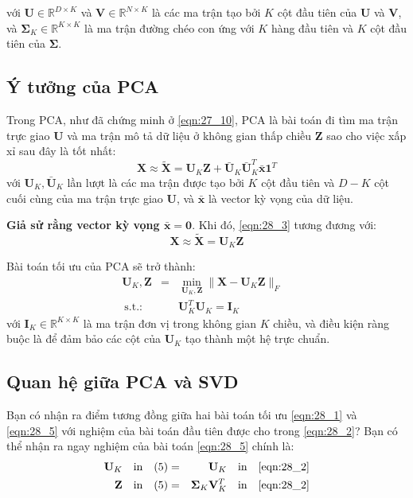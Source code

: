 với $\mathbf{U} \in \mathbb{R}^{D \times K}$ và $\mathbf{V}\in \mathbb{R}^{N\times K}$ là các ma trận tạo bởi $K$ cột đầu tiên của $\mathbf{U}$ và $\mathbf{V}$, và $\mathbf{\Sigma}_K \in \mathbb{R}^{K \times K}$ là ma trận đường chéo con ứng với $K$ hàng đầu tiên và $K$ cột đầu tiên của $\mathbf{\Sigma}$. 
 
 
\subsection{Ý tưởng của PCA}
Trong PCA, như đã chứng minh ở \eqref{eqn:27_10}, PCA là bài toán đi tìm ma trận trực giao $\mathbf{U}$ và ma trận mô tả dữ liệu ở không gian thấp chiều $\mathbf{Z}$ sao cho việc xấp xỉ sau đây là tốt nhất: 
\begin{equation} 
\label{eqn:28_3}
\mathbf{X} \approx \tilde{\mathbf{X}} = \mathbf{U}_K \mathbf{Z} + \bar{\mathbf{U}}_K \bar{\mathbf{U}}_K^T\bar{\mathbf{x}}\mathbf{1}^T 
\end{equation} 
với $\mathbf{U}_K, \bar{\mathbf{U}}_K$ lần lượt là các ma trận được tạo bởi $K$ cột đầu tiên và $D-K$ cột cuối cùng của ma trận trực giao $\mathbf{U}$, và $\bar{\mathbf{x}}$ là vector kỳ vọng của dữ liệu. 
 
\textbf{Giả sử rằng vector kỳ vọng $\bar{\mathbf{x}} = \mathbf{0}$}. Khi đó, \eqref{eqn:28_3} tương đương với: 
\begin{equation} 
\label{eqn:28_4}
\mathbf{X} \approx \tilde{\mathbf{X}} = \mathbf{U}_K \mathbf{Z}
\end{equation} 
 
Bài toán tối ưu của PCA sẽ trở thành: 
\begin{equation} 
\label{eqn:28_5}
\begin{aligned} 
  \mathbf{U}_K, \mathbf{Z} &=& \min_{\mathbf{U}_K, \mathbf{Z} } \|\mathbf{X} - \mathbf{U}_K \mathbf{Z}\|_F\\\ 
  \text{s.t.:}&& \mathbf{U}_K^T \mathbf{U}_K = \mathbf{I}_K & 
\end{aligned} 
\end{equation} 
với $\mathbf{I}_K \in \mathbb{R}^{K\times K}$ là ma trận đơn vị trong không gian $K$ chiều, và điều kiện ràng buộc là để đảm bảo các cột của $\mathbf{U}_K$ tạo thành một hệ trực chuẩn. 
 
 
\subsection{Quan hệ giữa PCA và SVD}
Bạn có nhận ra điểm tương đồng giữa hai bài toán tối ưu \eqref{eqn:28_1} và \eqref{eqn:28_5} với nghiệm của bài toán đầu tiên được cho trong \eqref{eqn:28_2}? Bạn có thể nhận ra ngay nghiệm của bài toán \eqref{eqn:28_5} chính là: 
\begin{eqnarray} 
  \mathbf{U}_K \quad \text{in}\quad (5) &=& \mathbf{U}_K\quad \text{in} \quad \eqref{eqn:28_2} \\\ 
  \mathbf{Z} \quad\text{in}\quad (5) &=& \mathbf{\Sigma}_K \mathbf{V}_K^T \quad \text{in} \quad \eqref{eqn:28_2} 
\end{eqnarray} 
 
